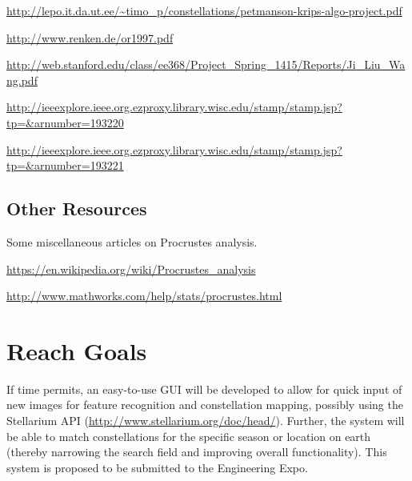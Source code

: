 \documentclass{article}
\begin{document}
\url{http://lepo.it.da.ut.ee/~timo_p/constellations/petmanson-krips-algo-project.pdf}

\url{http://www.renken.de/or1997.pdf}

\url{http://web.stanford.edu/class/ee368/Project_Spring_1415/Reports/Ji_Liu_Wang.pdf}

\url{http://ieeexplore.ieee.org.ezproxy.library.wisc.edu/stamp/stamp.jsp?tp=&arnumber=193220}

\url{http://ieeexplore.ieee.org.ezproxy.library.wisc.edu/stamp/stamp.jsp?tp=&arnumber=193221}

\subsection{Other Resources}
Some miscellaneous articles on Procrustes analysis.

\url{https://en.wikipedia.org/wiki/Procrustes_analysis}

\url{http://www.mathworks.com/help/stats/procrustes.html}

\section{Reach Goals}
If time permits, an easy-to-use GUI will be developed to allow for quick input of new images for feature recognition and constellation mapping, possibly using the Stellarium API (\url{http://www.stellarium.org/doc/head/}). Further, the system will be able to match constellations for the specific season or location on earth (thereby narrowing the search field and improving overall functionality). This system is proposed to be submitted to the Engineering Expo.
\end{document}

